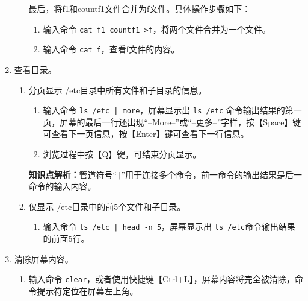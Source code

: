 \begin{enumerate}
\begin{enumerate}
    最后，将f1和countf1文件合并为f文件。具体操作步骤如下：
    \begin{enumerate}
      \item 输入命令 \verb|cat f1 countf1 >f|，将两个文件合并为一个文件。
      \item 输入命令 \verb|cat f|，查看f文件的内容。
    \end{enumerate}
    \end{enumerate}
  \item 查看目录。
    \begin{enumerate}
      \item 分页显示 /etc目录中所有文件和子目录的信息。
    \begin{enumerate}
      \item 输入命令 \verb=ls /etc | more=，屏幕显示出 \verb|ls /etc| 命令输出结果的第一页，屏幕的最后一行还出现“--More--”或“--更多--”字样，按【Space】键可查看下一页信息，按【Enter】键可查看下一行信息。
      \item 浏览过程中按【Q】键，可结束分页显示。
    \end{enumerate}
    \textbf{知识点解析：}管道符号“\verb=|=”用于连接多个命令，前一命令的输出结果是后一命令的输入内容。
  \item 仅显示 /etc目录中的前5个文件和子目录。
    \begin{enumerate}
      \item 输入命令 \verb=ls /etc | head -n 5=，屏幕显示出 \verb|ls /etc|命令输出结果的前面5行。
    \end{enumerate}
    \end{enumerate}
  \item 清除屏幕内容。
    \begin{enumerate}
      \item 输入命令 \verb|clear|，或者使用快捷键【Ctrl+L】，屏幕内容将完全被清除，命令提示符定位在屏幕左上角。
    \end{enumerate}
\end{enumerate}

